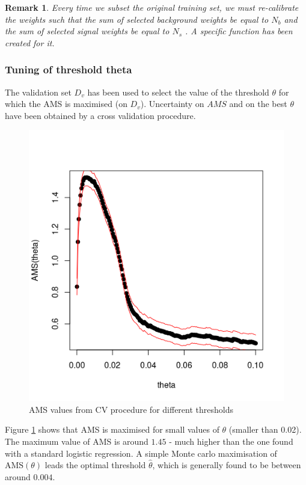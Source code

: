 \documentclass[]{article}
\newtheorem{remark}[theorem]{Remark}
\begin{document}
\begin{remark}
Every time we subset the original training set, we must re-calibrate the weights such that the sum of selected background weights be equal to $N_b$ and the sum of selected signal weights be equal to $N_s$ . A specific function has been created for it.
\end{remark} 



\subsubsection{Tuning of threshold theta}
The validation set $D_v$ has been used to select the value of the threshold $\theta$ for which the AMS is maximised (on $D_v$). Uncertainty on $AMS$ and on the best $\theta$ have been obtained by a cross validation procedure.


\begin{figure}[H]
\centering
\includegraphics[scale=0.7]{../Pictures/traintunedtheta.png}
\caption{AMS values from CV procedure for different thresholds}
\label{fig: train_tuned_theta}
\end{figure}

Figure \ref{fig: train_tuned_theta} shows that AMS is maximised for small values of $\theta$ (smaller than 0.02). The maximum value of AMS is around $1.45$ - much higher than the one found with a standard logistic regression. A simple Monte carlo maximisation of $\text{AMS}(\theta)$ leads the optimal threshold $\hat{\theta}$, which is generally found to be between around $0.004$. \\
\end{document}
